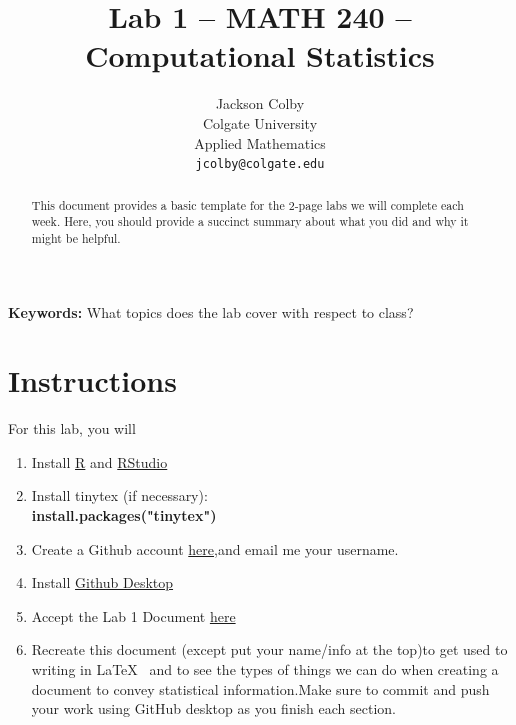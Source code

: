 \documentclass{article}\usepackage[]{graphicx}\usepackage[]{xcolor}
\begin{document}
\vspace{-1in}
\title{Lab 1 -- MATH 240 -- Computational Statistics}

\author{
  Jackson Colby \\
  Colgate University  \\
  Applied Mathematics  \\
  {\tt jcolby@colgate.edu} }

\date{}

\maketitle

\begin{multicols}{2}
\begin{abstract}
This document provides a basic template for the 2-page labs we will complete each week. Here, you should provide a succinct summary about what you did and why it might be helpful.
\end{abstract}

\textbf{Keywords:} What topics does the lab cover with respect
 to class?



\section{Instructions}
For this lab, you will
\begin{enumerate}[1.]\itemsep0em
\item Install \href{https://cran.rstudio.com/}{R} and \href{https://posit.co/download/rstudio-desktop/}{RStudio}
\item Install tinytex (if necessary): \\ \textbf{install.packages("tinytex")}
\item Create a Github account \href{ https://github.com/}{here},and email me your username.
\item Install \href{https://github.com/apps/desktop}{Github Desktop} 
\item Accept the Lab 1 Document \href{https://github.com/login?client_id=Iv1.a84bfcae38835499&return_to=%2Flogin%2Foauth%2Fauthorize%3Fclient_id%3DIv1.a84bfcae38835499%26redirect_uri%3Dhttps%253A%252F%252Fclassroom.github.com%252Fauth%252Fgithub%252Fcallback%26response_type%3Dcode%26state%3D3567fc1aae917e5c0b1e3adfdc1ef646081add6f7014be60}{here}
\item Recreate this document (except put your name/info at
 the top)to get used to writing in \LaTeX~ and to see the
 types of things we can do when creating a document
 to convey statistical information.Make sure to commit
 and push your work using GitHub desktop as you finish
 each section.
\end{enumerate}


\end{multicols}
\end{document}
